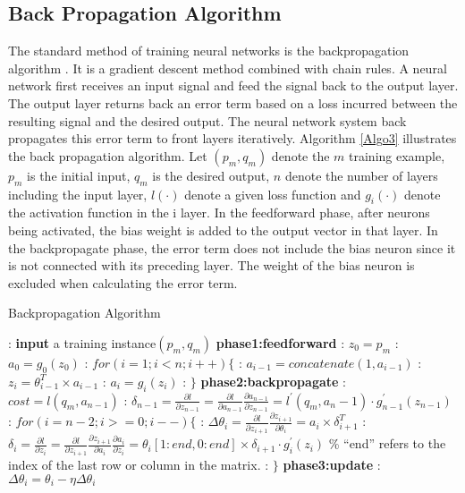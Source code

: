 \subsection{Back Propagation Algorithm}
The standard method of training neural networks is the backpropagation algorithm \cite{werbos1974}. It is a gradient descent method combined with chain rules. A neural network first receives an input signal and feed the signal back to the output layer. The output layer returns back an error term based on a loss incurred between the resulting signal and the desired output. The neural network system back propagates this error term to front layers iteratively. Algorithm \ref{Algo3} illustrates the back propagation algorithm. Let $(p_m, q_m)$ denote the $m$  training example, $p_m$ is the initial input, $q_m$ is the desired output, $n$ denote the number of layers including the input layer, $l(\cdot)$ denote a given loss function and $g_i(\cdot)$ denote the activation function in the i layer. In the feedforward phase, after neurons being activated, the bias weight is added to the output vector in that layer. In the backpropagate phase, the error term does not include the bias neuron since it is not connected with its preceding layer. The weight of the bias neuron is excluded when calculating the error term. 
\begin{algorithm}
\caption{Backpropagation Algorithm}
\label{Algo3}
\begin{algorithmic}
: \textbf{input} a training instance$(p_m,q_m)$
\STATE \textbf{phase1:feedforward}
: $z_0=p_m$
: $a_0=g_0(z_0)$
: $for(i=1;i<n;i++)\{$
: \hspace{2mm}$a_{i-1}=concatenate(1,a_{i-1})$
: \hspace{2mm}$z_i=\theta_{i-1}^T\times a_{i-1}$
: \hspace{2mm}$a_i=g_i(z_i)$
: $\}$
\STATE  \textbf{phase2:backpropagate}
: \hspace{1.2mm}$cost=l(q_m,a_{n-1})$
: \hspace{1.2mm}$\delta_{n-1}=\frac{\partial l}{\partial z_{n-1}}=\frac{\partial l}{\partial a_{n-1}}\frac{\partial a_{n-1}}{\partial z_{n-1}}=l^{'}(q_m,a_n-1)\cdot g_{n-1}^{'}(z_{n-1})$
: $for(i=n-2;i>=0;i--)\{$
: \hspace{2mm}$\Delta \theta_i=\frac{\partial l}{\partial z_{i+1}}\frac{\partial z_{i+1}}{\partial \theta_i}= a_i\times \delta_{i+1}^T$
: \hspace{2mm}$\delta_i = \frac{\partial l}{\partial z_i}=\frac{\partial l}{\partial z_{i+1}}\frac{\partial z_{i+1}}{\partial a_i}\frac{\partial a_i}{\partial z_i}=\theta_i[1:end,0:end]\times \delta_{i+1}\cdot g_i^{'}(z_i)$
\STATE \% ``end'' refers to the index of the last row or column in the matrix.
: $\}$
\STATE \textbf{phase3:update}
: $\Delta\theta_i=\theta_i-\eta\Delta\theta_i$

\end{algorithmic}
\end{algorithm}



